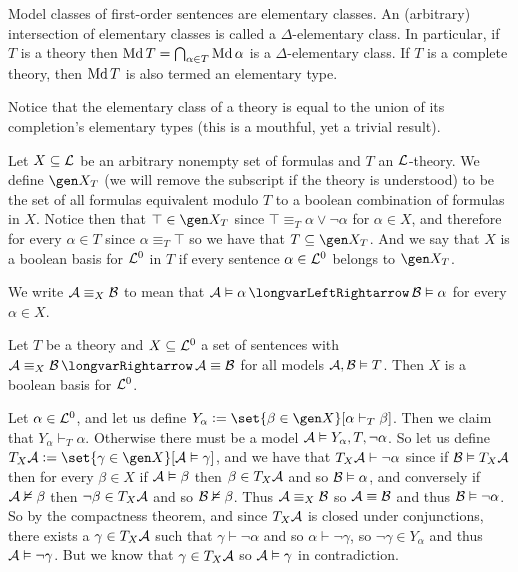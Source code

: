 \bdefn

    Model classes of first-order sentences are {\emphcolor elementary classes}.
    An (arbitrary) intersection of elementary classes is called a {\emphcolor $\Delta$-elementary class}.
    In particular, if $T$ is a theory then $\mathop{\rm Md} T=\bigcap_{\alpha\in T}\mathop{\rm Md}\alpha$ is a $\Delta$-elementary class.
    If $T$ is a complete theory, then $\mathop{\rm Md} T$ is also termed an {\emphcolor elementary type}.

\edefn

Notice that the elementary class of a theory is equal to the union of its completion's elementary types (this is a mouthful, yet a trivial result).

\bdefn

    Let $X\subseteq{\cal L}$ be an arbitrary nonempty set of formulas and $T$ an ${\cal L}$-theory.
    We define $\gen X_T$ (we will remove the subscript if the theory is understood) to be the set of all formulas equivalent modulo $T$ to a boolean combination of formulas in $X$.
    Notice then that $\top\in\gen X_T$ since $\top\equiv_T\alpha\lor\neg\alpha$ for $\alpha\in X$, and therefore for every $\alpha\in T$ since $\alpha\equiv_T\top$ so we have that $T\subseteq\gen X_T$.
    And we say that $X$ is a {\emphcolor boolean basis for ${\cal L}^0$ in $T$} if every sentence $\alpha\in{\cal L}^0$ belongs to $\gen X_T$.

\edefn

We write ${\cal A}\equiv_X{\cal B}$ to mean that ${\cal A}\vDash\alpha\iff{\cal B}\vDash\alpha$ for every $\alpha\in X$.

\bthrm[title=Basis Theorem for Sentences, name=basistheorem]

    Let $T$ be a theory and $X\subseteq{\cal L}^0$ a set of sentences with ${\cal A}\equiv_X{\cal B}\implies{\cal A}\equiv{\cal B}$ for all models ${\cal A},{\cal B}\vDash T$.
    Then $X$ is a boolean basis for ${\cal L}^0$.

\ethrm

Let $\alpha\in{\cal L}^0$, and let us define $Y_\alpha\coloneqq\set{\beta\in\gen X}[\alpha\vdash_T\beta]$.
Then we claim that $Y_\alpha\vdash_T\alpha$.
Otherwise there must be a model ${\cal A}\vDash Y_\alpha,T,\neg\alpha$.
So let us define $T_X{\cal A}\coloneqq\set{\gamma\in\gen X}[{\cal A}\vDash\gamma]$, and we have that $T_X{\cal A}\vdash\neg\alpha$ since if ${\cal B}\vDash T_X{\cal A}$ then for every $\beta\in X$ if
${\cal A}\vDash\beta$ then $\beta\in T_X{\cal A}$ and so ${\cal B}\vDash\alpha$, and conversely if ${\cal A}\nvDash\beta$ then $\neg\beta\in T_X{\cal A}$ and so ${\cal B}\nvDash\beta$.
Thus ${\cal A}\equiv_X{\cal B}$ so ${\cal A}\equiv{\cal B}$ and thus ${\cal B}\vDash\neg\alpha$.
So by the compactness theorem, and since $T_X{\cal A}$ is closed under conjunctions, there exists a $\gamma\in T_X{\cal A}$ such that $\gamma\vdash\neg\alpha$ and so $\alpha\vdash\neg\gamma$, so
$\neg\gamma\in Y_\alpha$ and thus ${\cal A}\vDash\neg\gamma$.
But we know that $\gamma\in T_X{\cal A}$ so ${\cal A}\vDash\gamma$ in contradiction.


